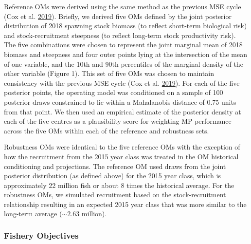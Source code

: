 \documentclass[11pt]{book}
\begin{document}
Reference OMs were derived using the same method as the previous MSE cycle (Cox et al. \protect\hyperlink{ref-cox2019evaluating}{2019}). Briefly, we derived five OMs defined by the joint posterior distribution of 2018 spawning stock biomass (to reflect short-term biological risk) and stock-recruitment steepness (to reflect long-term stock productivity risk). The five combinations were chosen to represent the joint marginal mean of 2018 biomass and steepness and four outer points lying at the intersection of the mean of one variable, and the 10th and 90th percentiles of the marginal density of the other variable (Figure 1). This set of five OMs was chosen to maintain consistency with the previous MSE cycle (Cox et al. \protect\hyperlink{ref-cox2019evaluating}{2019}). For each of the five posterior points, the operating model was conditioned on a sample of 100 posterior draws constrained to lie within a Mahalanobis distance of 0.75 units from that point. We then used an empirical estimate of the posterior density at each of the five centres as a plausibility score for weighting MP performance across the five OMs within each of the reference and robustness sets.

Robustness OMs were identical to the five reference OMs with the exception of how the recruitment from the 2015 year class was treated in the OM historical conditioning and projections. The reference OM used draws from the joint posterior distribution (as defined above) for the 2015 year class, which is approximately 22 million fish or about 8 times the historical average. For the robustness OMs, we simulated recruitment based on the stock-recruitment relationship resulting in an expected 2015 year class that was more similar to the long-term average (\(\sim 2.63\) million).

\hypertarget{fishery-objectives}{%
\subsubsection{Fishery Objectives}\label{fishery-objectives}}
\end{document}
